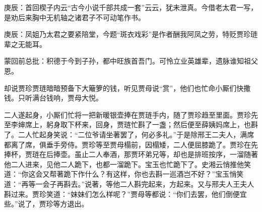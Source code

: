 \begin{parag}

    \begin{note}庚辰：首回楔子内云“古今小说千部共成一套”云云，犹未泄真。今借老太君一写，是劝后来胸中无机轴之诸君子不可动笔作书。\end{note}
\end{parag}


\begin{parag}


    \begin{note}庚辰：凤姐乃太君之要紧陪堂，今题“斑衣戏彩”是作者酬我阿凤之劳，特贬贾珍琏辈之无能耳。\end{note}
\end{parag}


\begin{parag}


    \begin{note}蒙回前总批：积德于今到子孙，都中旺族首吾门。可怜立业英雄辈，遗脉谁知祖父恩。\end{note}
\end{parag}

\begin{parag}

    却说贾珍贾琏暗暗预备下大簸箩的钱，听见贾母说“赏”，他们也忙命小厮们快撒钱。只听满台钱响，贾母大悦。
\end{parag}


\begin{parag}


    二人遂起身，小厮们忙将一把新暖银壶捧在贾琏手内，随了贾珍趋至里面。贾珍先至李婶席上，躬身取下杯来，回身，贾琏忙斟了一盏；然后便至薛姨妈席上，也斟了。二人忙起身笑说：“二位爷请坐著罢了，何必多礼。”于是除邢王二夫人，满席都离了席，俱垂手旁侍。贾珍等至贾母榻前，因榻矮，二人便屈膝跪了。贾珍在先捧杯，贾琏在后捧壶。虽止二人奉酒，那贾环弟兄等，却也是排班按序，一溜随著他二人进来，见他二人跪下，也都一溜跪下。宝玉也忙跪下了。史湘云悄推他笑道：“你这会又帮著跪下作什么？有这样，你也去斟一巡酒岂不好？”宝玉悄笑道：“再等一会子再斟去。”说著，等他二人斟完起来，方起来。又与邢夫人王夫人斟过来。贾珍笑道：“妹妹们怎么样呢？”贾母等都说：“你们去罢，他们倒便宜些。”说了，贾珍等方退出。
\end{parag}


